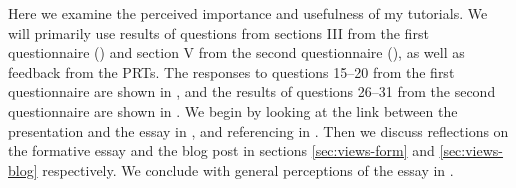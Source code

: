 Here we examine the perceived importance and usefulness of my tutorials. We will primarily use results of questions from sections III from the first questionnaire () and section V from the second questionnaire (), as well as feedback from the PRTs. The responses to questions 15--20 from the first questionnaire are shown in , and the results of questions 26--31 from the second questionnaire are shown in . We begin by looking at the link between the presentation and the essay in , and referencing in . Then we discuss reflections on the formative essay and the blog post in sections \ref{sec:views-form} and \ref{sec:views-blog} respectively. We conclude with general perceptions of the essay in .
\begin{figure}
  \centering
    \quad
    \\ 
    \quad

\end{figure}
